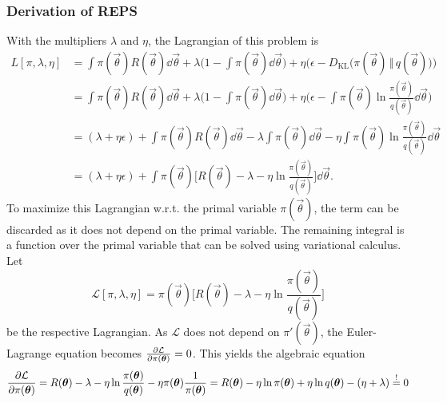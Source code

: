 			\subsubsection{Derivation of REPS}
				With the multipliers \( \lambda \) and \( \eta \), the Lagrangian of this problem is
				\begin{align}
					L[\pi, \lambda, \eta] &=
						  \int\! \pi(\vec{\theta}) R(\vec{\theta}) \dd{\vec{\theta}}
						+ \lambda \bigg(\! 1 - \int\! \pi(\vec{\theta}) \dd{\vec{\theta}} \!\!\bigg)
						+ \eta \big( \epsilon - D_\mathrm{KL}\big( \pi(\vec{\theta}) \,\Vert\, q(\vec{\theta}) \big) \big)  \nonumber \\
					&=
						  \int\! \pi(\vec{\theta}) R(\vec{\theta}) \dd{\vec{\theta}}
						+ \lambda \bigg(\! 1 - \int\! \pi(\vec{\theta}) \dd{\vec{\theta}} \!\!\bigg)
						+ \eta \bigg(\! \epsilon - \int\! \pi(\vec{\theta}) \ln \frac{\pi(\vec{\theta})}{q(\vec{\theta})} \dd{\vec{\theta}} \!\!\bigg)  \nonumber \\
					&= (\lambda + \eta \epsilon)
						+ \int\! \pi(\vec{\theta}) R(\vec{\theta}) \dd{\vec{\theta}}
						- \lambda \int\! \pi(\vec{\theta}) \dd{\vec{\theta}}
						- \eta \int\! \pi(\vec{\theta}) \ln \frac{\pi(\vec{\theta})}{q(\vec{\theta})} \dd{\vec{\theta}}  \label{eq:repsLagrangian} \\
					&= (\lambda + \eta\epsilon)
						+ \int\! \pi(\vec{\theta}) \bigg[ R(\vec{\theta}) - \lambda - \eta \ln \frac{\pi(\vec{\theta})}{q(\vec{\theta})} \bigg] \dd{\vec{\theta}}.  \nonumber
				\end{align}
				To maximize this Lagrangian w.r.t. the primal variable \( \pi(\vec{\theta}) \), the term can be discarded as it does not depend on the primal variable. The remaining integral is a function over the primal variable that can be solved using variational calculus. Let
				\begin{equation*}
					\mathcal{L}[\pi, \lambda, \eta] = \pi(\vec{\theta}) \bigg[ R(\vec{\theta}) - \lambda - \eta \ln \frac{\pi(\vec{\theta})}{q(\vec{\theta})} \bigg]
				\end{equation*}
				be the respective Lagrangian. As \(\mathcal{L}\) does not depend on \( \pi'(\vec{\theta}) \), the Euler-Lagrange equation becomes \( \pdv{\mathcal{L}}{\pi(\bm{\theta})} = 0 \). This yields the algebraic equation
				\begin{equation*}
					\pdv{\mathcal{L}}{\pi(\bm{\theta})}
						= R(\bm{\theta}) - \lambda - \eta \ln \frac{\pi(\bm{\theta})}{q(\bm{\theta})} - \eta \pi(\bm{\theta}) \frac{1}{\pi(\bm{\theta})}
						= R(\bm{\theta}) - \eta \ln \pi(\bm{\theta}) + \eta \ln q(\bm{\theta}) - (\eta + \lambda)
						\overset{!}{=} 0
				\end{equation*}
